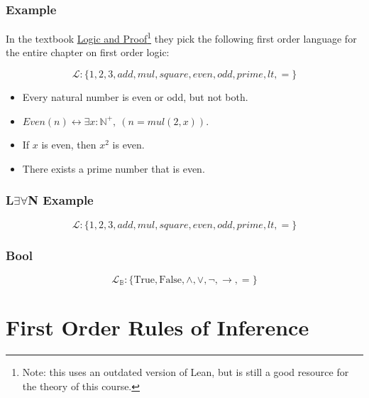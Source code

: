 \documentclass{beamer}
\theoremstyle{indentDefn} \newtheorem{defn}[]{Definition}
\begin{document}
\begin{frame}
	\frametitle{Example}
	
	In the textbook \href{https://leanprover.github.io/logic_and_proof_lean3/index.html}{Logic and Proof}\footnote{Note: this uses an outdated version of Lean, but is still a good resource for the theory of this course.} they pick the following first order language for the entire chapter on first order logic: 
	
	$$\mathcal{L}: \{1,2,3,add,mul,square,even,odd,prime,lt,=\}$$
	
	\begin{itemize}
		\item Every natural number is even or odd, but not both. \vspace{5mm}
		
		\item $Even(n) \leftrightarrow \exists x : \mathbb{N}^{+}, \ (n = mul(2,x))$. \vspace{5mm}
		
		\item If $x$ is even, then $x^{2}$ is even. \vspace{5mm}
		
		\item There exists a prime number that is even.
				
	\end{itemize}
\end{frame}

\begin{frame}
	\frametitle{L$\exists\forall$N Example}
	
	$$\mathcal{L}: \{1,2,3,add,mul,square,even,odd,prime,lt,=\}$$
	
	\vspace{60mm}	
	
\end{frame}

\begin{frame}
	\frametitle{Bool}

	$$\mathcal{L}_{\mathbb{B}} : \{\text{True}, \text{False}, \land, \lor, \lnot, \to, =\}$$

	\vspace{65mm}

\end{frame}

\section{First Order Rules of Inference}
\end{document}
